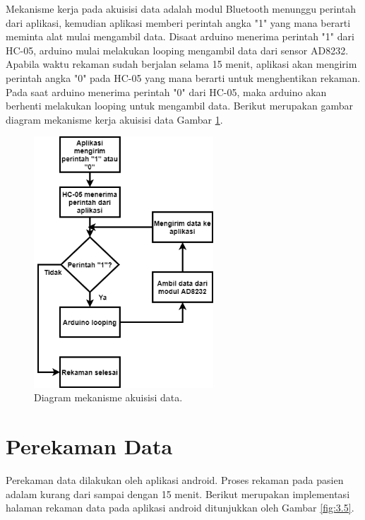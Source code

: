 Mekanisme kerja pada akuisisi data adalah modul Bluetooth menunggu perintah dari aplikasi, kemudian aplikasi memberi perintah angka "1" yang mana berarti meminta alat mulai mengambil data. Disaat arduino menerima perintah "1" dari HC-05, arduino mulai melakukan looping mengambil data dari sensor AD8232. Apabila waktu rekaman sudah berjalan selama 15 menit, aplikasi akan mengirim perintah angka "0" pada HC-05 yang mana berarti untuk menghentikan rekaman. Pada saat arduino menerima perintah "0" dari HC-05, maka arduino akan berhenti melakukan looping untuk mengambil data. Berikut merupakan gambar diagram mekanisme kerja akuisisi data Gambar \ref{fig:3.4.2}.
\begin{figure}[H] \centering
	\includegraphics[width=0.6\textwidth]{img/diagramAkuisisi.png}
	\caption{Diagram mekanisme akuisisi data.}
	\label{fig:3.4.2}
\end{figure}


\section{Perekaman Data}
\vspace{1ex}
Perekaman data dilakukan oleh aplikasi android. Proses rekaman pada pasien adalam kurang dari sampai dengan 15 menit. Berikut merupakan implementasi halaman rekaman data pada aplikasi android ditunjukkan oleh Gambar \ref{fig:3.5}.

